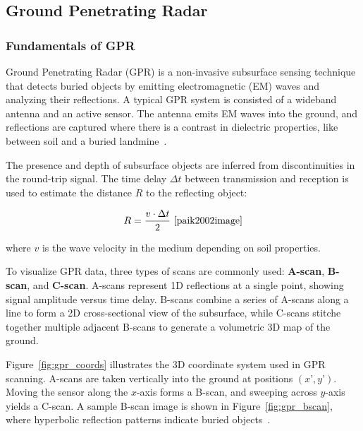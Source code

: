 \subsection{Ground Penetrating Radar}

\subsubsection{Fundamentals of GPR}

Ground Penetrating Radar (GPR) is a non-invasive subsurface sensing technique that detects buried objects by emitting electromagnetic (EM) waves and analyzing their reflections. A typical GPR system is consisted of a wideband antenna and an active sensor. The antenna emits EM waves into the ground, and reflections are captured where there is a contrast in dielectric properties, like between soil and a buried landmine~\cite{paik2002image}.

The presence and depth of subsurface objects are inferred from discontinuities in the round-trip signal. The time delay $\Delta t$ between transmission and reception is used to estimate the distance $R$ to the reflecting object:

\[
R = \frac{v \cdot \Delta t}{2} ~\cite{paik2002image}
\]

where $v$ is the wave velocity in the medium depending on soil properties.

To visualize GPR data, three types of scans are commonly used: \textbf{A-scan}, \textbf{B-scan}, and \textbf{C-scan}. A-scans represent 1D reflections at a single point, showing signal amplitude versus time delay. B-scans combine a series of A-scans along a line to form a 2D cross-sectional view of the subsurface, while C-scans stitche together multiple adjacent B-scans to generate a volumetric 3D map of the ground. 

Figure~\ref{fig:gpr_coords} illustrates the 3D coordinate system used in GPR scanning. A-scans are taken vertically into the ground at positions $(x’, y’)$. Moving the sensor along the $x$-axis forms a B-scan, and sweeping across $y$-axis yields a C-scan. A sample B-scan image is shown in Figure~\ref{fig:gpr_bscan}, where hyperbolic reflection patterns indicate buried objects~\cite{paik2002image}.

